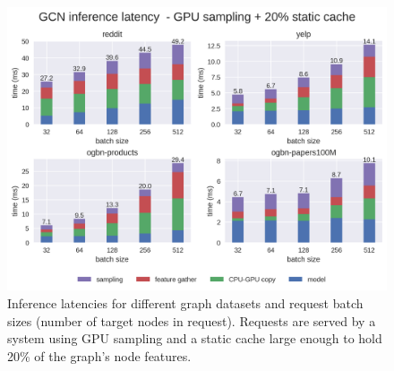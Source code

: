 \begin{figure}[h!]
    \centering
    \includegraphics[width=\textwidth]{figures/GCN_latency_breakdown_gpu_sampled_with_cache.png}
    
    \caption{Inference latencies for different graph datasets and request batch sizes (number of target nodes in request). Requests are served by a system using GPU sampling and a static cache large enough to hold 20\% of the graph's node features.}
    \label{GPU Sampling Latency Breakdown}
\end{figure}    

